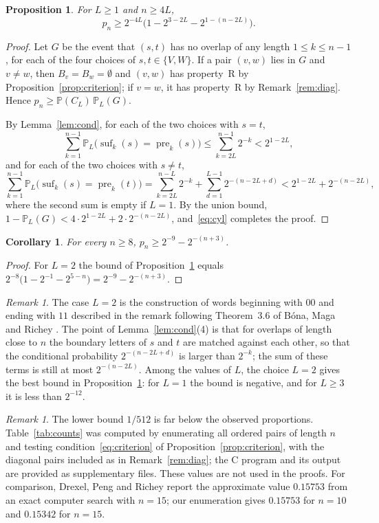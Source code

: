 \documentclass[11pt]{amsart}
\newtheorem{proposition}[theorem]{Proposition}
\newtheorem{corollary}[theorem]{Corollary}
\theoremstyle{remark}
\newtheorem{remark}[theorem]{Remark}
\numberwithin{equation}{section}
\newcommand{\pre}{\operatorname{pre}}
\newcommand{\suf}{\operatorname{suf}}
\newcommand{\PP}{\mathbb{P}}
\begin{document}
\begin{proposition}\label{prop:lower}
For $L\ge1$ and $n\ge 4L$,
\[
  p_n\ge 2^{-4L}\bigl(1-2^{3-2L}-2^{1-(n-2L)}\bigr).
\]
\end{proposition}

\begin{proof}
Let $G$ be the event that $(s,t)$ has no overlap of any length $1\le k\le n-1$, for each of the four choices of $s,t\in\{V,W\}$. If a pair $(v,w)$ lies in $G$ and $v\ne w$, then $B_v=B_w=\emptyset$ and $(v,w)$ has property~R by Proposition~\ref{prop:criterion}; if $v=w$, it has property~R by Remark~\ref{rem:diag}. Hence $p_n\ge\PP(C_L)\,\PP_L(G)$.

By Lemma~\ref{lem:cond}, for each of the two choices with $s=t$,
\[
  \sum_{k=1}^{n-1}\PP_L\bigl(\suf_k(s)=\pre_k(s)\bigr)\le\sum_{k=2L}^{n-1}2^{-k}<2^{1-2L},
\]
and for each of the two choices with $s\ne t$,
\[
  \sum_{k=1}^{n-1}\PP_L\bigl(\suf_k(s)=\pre_k(t)\bigr)
  =\sum_{k=2L}^{n-L}2^{-k}+\sum_{d=1}^{L-1}2^{-(n-2L+d)}
  <2^{1-2L}+2^{-(n-2L)},
\]
where the second sum is empty if $L=1$. By the union bound, $1-\PP_L(G)<4\cdot2^{1-2L}+2\cdot2^{-(n-2L)}$, and~\eqref{eq:cyl} completes the proof.
\end{proof}

\begin{corollary}\label{cor:lower}
For every $n\ge8$, $p_n\ge 2^{-9}-2^{-(n+3)}$.
\end{corollary}

\begin{proof}
For $L=2$ the bound of Proposition~\ref{prop:lower} equals $2^{-8}\bigl(1-2^{-1}-2^{5-n}\bigr)=2^{-9}-2^{-(n+3)}$.
\end{proof}

\begin{remark}
The case $L=2$ is the construction of words beginning with $00$ and ending with $11$ described in the remark following Theorem~3.6 of Bóna, Maga and Richey \cite[p.~10]{BMR}. The point of Lemma~\ref{lem:cond}(4) is that for overlaps of length close to $n$ the boundary letters of $s$ and $t$ are matched against each other, so that the conditional probability $2^{-(n-2L+d)}$ is larger than $2^{-k}$; the sum of these terms is still at most $2^{-(n-2L)}$. Among the values of $L$, the choice $L=2$ gives the best bound in Proposition~\ref{prop:lower}: for $L=1$ the bound is negative, and for $L\ge3$ it is less than $2^{-12}$.
\end{remark}

\begin{remark}\label{rem:numerics}
The lower bound $1/512$ is far below the observed proportions. Table~\ref{tab:counts} was computed by enumerating all ordered pairs of length $n$ and testing condition~\eqref{eq:criterion} of Proposition~\ref{prop:criterion}, with the diagonal pairs included as in Remark~\ref{rem:diag}; the C program and its output are provided as supplementary files. These values are not used in the proofs. For comparison, Drexel, Peng and Richey \cite[p.~8]{DPR} report the approximate value $0.15753$ from an exact computer search with $n=15$; our enumeration gives $0.15753$ for $n=10$ and $0.15342$ for $n=15$.
\end{remark}
\end{document}
